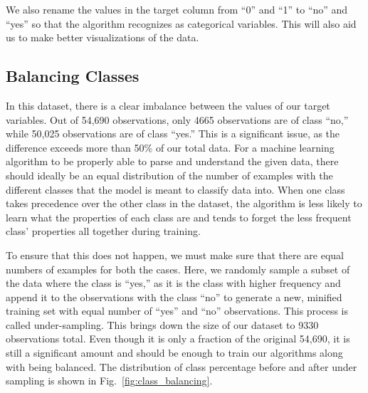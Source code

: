 \documentclass[runningheads]{llncs}
\begin{document}
We also rename the values in the target column from ``0'' and ``1'' to
``no'' and ``yes'' so that the algorithm recognizes as categorical
variables. This will also aid us to make better visualizations of the
data.

\hypertarget{balancing-classes}{%
\subsection{Balancing Classes}\label{balancing-classes}}

In this dataset, there is a clear imbalance between the values of our
target variables. Out of 54,690 observations, only 4665 observations are
of class ``no,'' while 50,025 observations are of class ``yes.'' This is
a significant issue, as the difference exceeds more than 50\% of our
total data. For a machine learning algorithm to be properly able to
parse and understand the given data, there should ideally be an equal
distribution of the number of examples with the different classes that
the model is meant to classify data into. When one class takes
precedence over the other class in the dataset, the algorithm is less
likely to learn what the properties of each class are and tends to
forget the less frequent class' properties all together during training.

To ensure that this does not happen, we must make sure that there are
equal numbers of examples for both the cases. Here, we randomly sample a
subset of the data where the class is ``yes,'' as it is the class with
higher frequency and append it to the observations with the class ``no''
to generate a new, minified training set with equal number of ``yes''
and ``no'' observations. This process is called under-sampling. This
brings down the size of our dataset to 9330 observations total. Even
though it is only a fraction of the original 54,690, it is still a
significant amount and should be enough to train our algorithms along
with being balanced. The distribution of class percentage before and
after under sampling is shown in Fig.~\ref{fig:class_balancing}.
\end{document}

